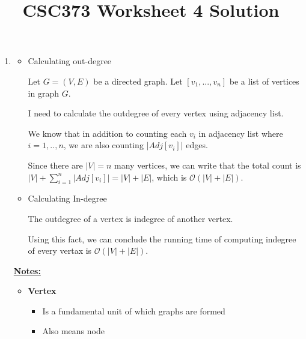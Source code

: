 \documentclass[12pt]{article}
\begin{document}
\title{CSC373 Worksheet 4 Solution}
\maketitle

\bigskip

\begin{enumerate}[1.]
    \item

    \begin{itemize}
        \item Calculating out-degree

        \bigskip

        Let $G = (V,E)$ be a directed graph. Let $[v_1,...,v_n]$ be a list of vertices
        in graph $G$.

        \bigskip

        I need to calculate the outdegree of every vertex using adjacency list.

        \bigskip

        We know that in addition to counting each $v_i$ in adjacency list where $i = 1, .., n$,
        we are also counting $\lvert Adj[v_i] \rvert$ edges.

        \bigskip

        Since there are $\lvert V \rvert = n$ many vertices, we can write that
        the total count is $\lvert V \rvert + \sum\limits_{i=1}^{n} \lvert Adj[v_i] \rvert = \lvert V \rvert + \lvert E \rvert$,
        which is $\mathcal{O}(\lvert V \rvert + \lvert E \vert)$.

        \bigskip

        \item Calculating In-degree

        \bigskip

        The outdegree of a vertex is indegree of another vertex.

        \bigskip

        Using this fact, we can conclude the running time of computing indegree of every vertax is $\mathcal{O}(\lvert V \rvert + \lvert E \vert)$.

    \end{itemize}

    \underline{\textbf{Notes:}}

    \bigskip

    \begin{itemize}
        \item \textbf{Vertex}
        \begin{itemize}
            \item Is a fundamental unit of which graphs are formed
            \item Also means node


\end{itemize}
\end{itemize}
\end{enumerate}
\end{document}
